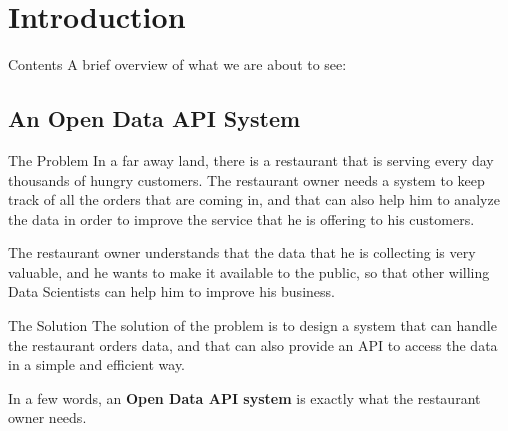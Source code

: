

\section[Introduction]{Introduction}

\begin{frame}{Contents}
	A brief overview of what we are about to see:
	\tableofcontents
\end{frame}

\subsection{An Open Data API System}

\begin{frame}{The Problem}
	In a far away land, there is a restaurant that is serving every day
	thousands of hungry customers. The restaurant owner needs a system to keep
	track of all the orders that are coming in, and that can also help him to
	analyze the data in order to improve the service that he is offering to his
	customers.

	The restaurant owner understands that the data that he is collecting is very
	valuable, and he wants to make it available to the public, so that other
	willing Data Scientists can help him to improve his	business.
\end{frame}

\begin{frame}{The Solution}
	The solution of the problem is to design a system that can handle the
	restaurant orders data, and that can also provide an API to access the data
	in a simple and efficient way.

	In a few words, an \textbf{Open Data API system} is exactly what the
	restaurant owner needs.
\end{frame}


